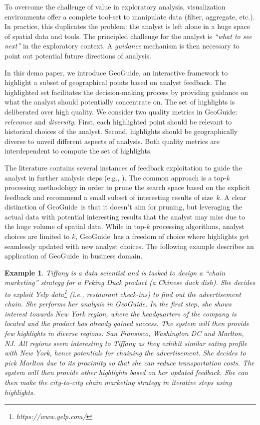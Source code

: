 \documentclass{vldb}
\newtheorem{example}{Example}
\newcommand{\framework}{{\sc GeoGuide}}
\begin{document}
To overcome the challenge of value in exploratory analysis, visualization environments offer a complete tool-set to manipulate data (filter, aggregate, etc.). In practice, this duplicates the problem: the analyst is left alone in a huge space of spatial data and tools. The principled challenge for the analyst is {\em ``what to see next''} in the exploratory context. A {\em guidance} mechanism is then necessary to point out potential future directions of analysis.

In this demo paper, we introduce \framework, an interactive framework to highlight a subset of geographical points based on analyst feedback. The highlighted set facilitates the decision-making process by providing guidance on what the analyst should potentially concentrate on. The set of highlights is deliberated over high quality. We consider two quality metrics in \framework: {\em relevance} and {\em diversity}. First, each highlighted point should be relevant to historical choices of the analyst. Second, highlights should be geographically diverse to unveil different aspects of analysis. Both quality metrics are interdependent to compute the set of highlights.

The literature contains several instances of feedback exploitation to guide the analyst in further analysis steps (e.g., \cite{boley2013one}). The common approach is a top-$k$ processing methodology in order to prune the search space based on the explicit feedback and recommend a small subset of interesting results of size~$k$. A clear distinction of \framework\ is that it doesn't aim for pruning, but leveraging the actual data with potential interesting results that the analyst may miss due to the huge volume of spatial data. While in top-$k$ processing algorithms, analyst choices are limited to $k$, \framework\ has a freedom of choice where highlights get seamlessly updated with new analyst choices. The following example describes an application of \framework\ in business domain.

\begin{example}
\label{ex:flight}
Tiffany is a data scientist and is tasked to design a ``chain marketing'' strategy for a Peking Duck product (a Chinese duck dish). She decides to exploit Yelp data\footnote{\it https://www.yelp.com/} (i.e., restaurant check-ins) to find out the advertisement chain. She performs her analysis in \framework. In the first step, she shows interest towards New York region, where the headquarters of the company is located and the product has already gained success. The system will then provide few highlights in diverse regions: San Fransisco, Washington DC and Marlton, NJ. All regions seem interesting to Tiffany as they exhibit similar eating profile with New York, hence potentials for chaining the advertisement. She decides to pick Marlton due to its proximity so that she can reduce transportation costs. The system will then provide other highlights based on her updated feedback. She can then make the city-to-city chain marketing strategy in iterative steps using highlights.
\end{example}
\end{document}
